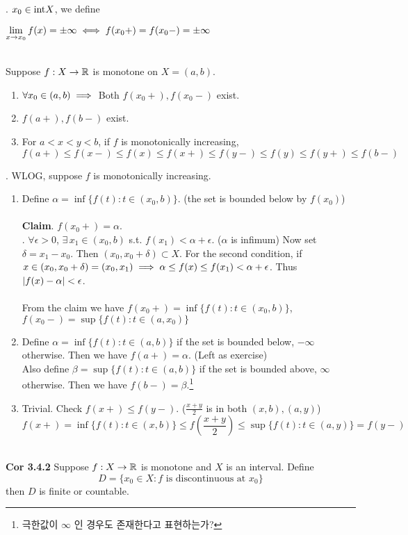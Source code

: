 \rmk. $x_0\in \mathrm{int} X$, we define
\begin{center}
	$\displaystyle\lim_{x\rightarrow x_0} f(x) = \pm \infty \iff f(x_0+) = f(x_0-) = \pm \infty$
\end{center}~\\
 Suppose $f:X\rightarrow\mathbb{R}$ is monotone on $X = (a, b)$.
\begin{enumerate}
	\item $\forall x_0\in (a, b) \implies $ Both $f(x_0+), f(x_0-)$ exist.
	\item $f(a+), f(b-)$ exist.
	\item For $a<x<y<b$, if $f$ is monotonically increasing, $$f(a+)\leq f(x-) \leq f(x) \leq f(x+) \leq f(y-) \leq f(y) \leq f(y+)\leq f(b-)$$
\end{enumerate}
\pf. WLOG, suppose $f$ is monotonically increasing.
\begin{enumerate}
	\item Define $\alpha = \inf\{f(t):t\in (x_0, b) \}$. (the set is bounded below by $f(x_0)$)\\
	\\
	\textbf{Claim}. $f(x_0+) = \alpha$.\\
	\pf. $\forall \epsilon > 0$, $\exists\, x_1\in (x_0, b)$ s.t. $f(x_1) < \alpha + \epsilon$. ($\alpha$ is infimum) Now set $\delta = x_1 - x_0$. Then $(x_0, x_0+\delta) \subset X$. For the second condition, if $x\in (x_0, x_0+\delta) = (x_0, x_1) \implies \alpha \leq f(x) \leq f(x_1)< \alpha + \epsilon$. Thus $\left|f(x) - \alpha\right| < \epsilon$.\\
	\\
	From the claim we have $f(x_0+) = \inf\{f(t): t\in (x_0, b) \}$, $f(x_0-) = \sup\{f(t): t\in (a, x_0) \}$
	\item Define $\alpha = \inf\{f(t):t\in (a, b) \}$ if the set is bounded below, $-\infty$ otherwise. Then we have $f(a+) = \alpha$. (Left as exercise)\\
	Also define $\beta = \sup\{f(t):t\in (a, b) \}$ if the set is bounded above, $\infty$ otherwise. Then we have $f(b-) = \beta$.\footnote{극한값이 $\infty$ 인 경우도 존재한다고 표현하는가?}
	\item Trivial. Check $f(x+) \leq f(y-)$. ($\frac{x+y}{2}$ is in both $(x, b), (a, y)$)
	$$f(x+) = \inf\{ f(t): t\in (x, b) \} \leq f\left(\frac{x+y}{2}\right) \leq \sup\{f(t):t\in (a, y) \} = f(y-)$$
\end{enumerate}~\\
\textbf{Cor 3.4.2} Suppose $f:X\rightarrow \mathbb{R}$ is monotone and $X$ is an interval. Define $$D=\{x_0\in X: f \text{ is discontinuous at } x_0 \}$$ then $D$ is finite or countable.\\
